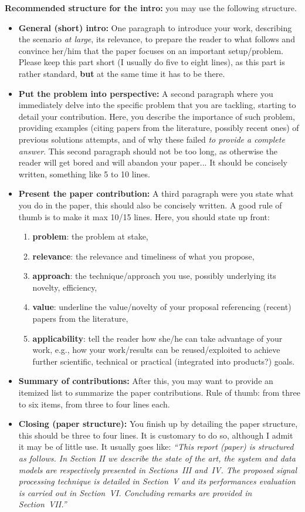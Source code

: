 \noindent \textbf{Recommended structure for the intro:} you may use the following structure. 
\begin{itemize}
\item \textbf{General (short) intro:} One paragraph to introduce your work, describing the scenario {\it at large}, its relevance, to prepare the reader to what follows and convince her/him that the paper focuses on an important setup/problem. Please keep this part short (I usually do five to eight lines), as this part is rather standard, \textbf{but} at the same time it has to be there. 
\item \textbf{Put the problem into perspective:} A second paragraph where you immediately delve into the specific problem that you are tackling, starting to detail your contribution. Here, you describe the importance of such problem, providing examples (citing papers from the literature, possibly recent ones) of previous solutions attempts, and of why these failed {\it to provide a complete answer}. This second paragraph should not be too long, as otherwise the reader will get bored and will abandon your paper... It should be concisely written, something like 5 to 10 lines.
\item \textbf{Present the paper contribution:} A third paragraph were you state what you do in the paper, this should also be concisely written. A good rule of thumb is to make it max 10/15 lines. Here, you should state up front:
\begin{enumerate}
\item \textbf{problem}: the problem at stake, 
\item \textbf{relevance}: the relevance and timeliness of what you propose, 
\item \textbf{approach}: the technique/approach you use, possibly underlying its novelty, efficiency, 
\item \textbf{value}: underline the value/novelty of your proposal referencing (recent) papers from the literature,
\item \textbf{applicability}: tell the reader how she/he can take advantage of your work, e.g., how your work/results can be reused/exploited to achieve further scientific, technical or practical (integrated into products?) goals.
\end{enumerate}
\item \textbf{Summary of contributions:} After this, you may want to provide an itemized list to summarize the paper contributions. Rule of thumb: from three to six items, from three to four lines each.
\item \textbf{Closing (paper structure):} You finish up by detailing the paper structure, this should be three to four lines. It is customary to do so, although I admit it may be of little use. It usually goes like: {\it ``This report (paper) is structured as follows. In Section II we describe the state of the art, the system and data models are respectively presented in Sections~III and~IV. The proposed signal processing technique is detailed in Section~V and its performances evaluation is carried out in Section~VI. Concluding remarks are provided in Section~VII.''}
\end{itemize}

